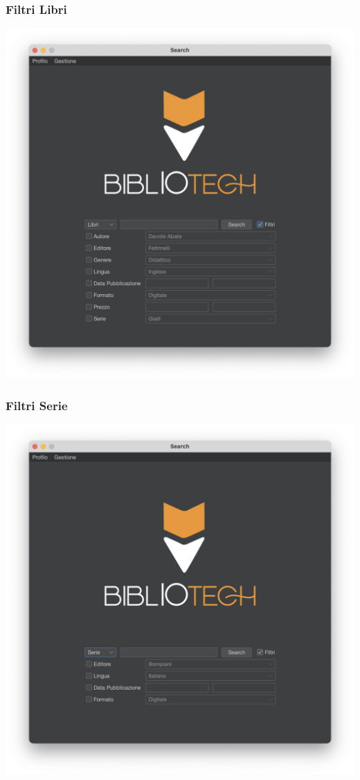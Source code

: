  \subsubsection{Filtri Libri}
 \includegraphics[scale=0.25, center]{Immagini/Schermate/Search/SearchPage-FiltriLibro.png}
 \subsubsection{Filtri Serie}
 \includegraphics[scale=0.25, center]{Immagini/Schermate/Search/SearchPage-FiltriSerie.png}
